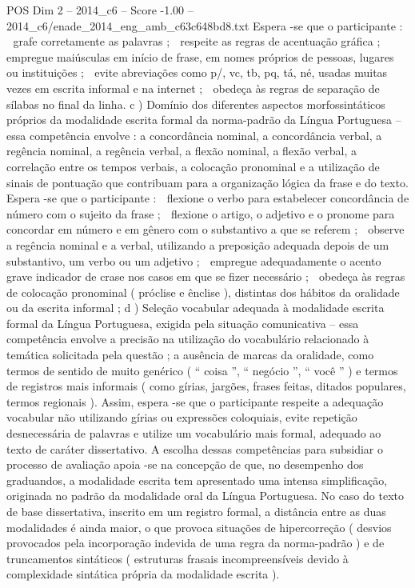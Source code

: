 \begin{textsample}{POS Dim 2 – 2014\_c6 – Score -1.00 – 2014\_c6/enade\_2014\_eng\_amb\_c63c648bd8.txt}
Espera -se que o participante :  grafe corretamente as palavras ;  respeite as regras de acentuação gráfica ;  empregue maiúsculas em início de frase, em nomes próprios de pessoas, lugares ou instituições ;  evite abreviações como p/, vc, tb, pq, tá, né, usadas muitas vezes em escrita informal e na internet ;  obedeça às regras de separação de sílabas no final da linha. c ) Domínio dos diferentes aspectos morfossintáticos próprios da modalidade escrita formal da norma-padrão da Língua Portuguesa – essa competência envolve : a concordância nominal, a concordância verbal, a regência nominal, a regência verbal, a flexão nominal, a flexão verbal, a correlação entre os tempos verbais, a colocação pronominal e a utilização de sinais de pontuação que contribuam para a organização lógica da frase e do texto.
Espera -se que o participante :  flexione o verbo para estabelecer concordância de número com o sujeito da frase ;  flexione o artigo, o adjetivo e o pronome para concordar em número e em gênero com o substantivo a que se referem ;  observe a regência nominal e a verbal, utilizando a preposição adequada depois de um substantivo, um verbo ou um adjetivo ;  empregue adequadamente o acento grave indicador de crase nos casos em que se fizer necessário ;  obedeça às regras de colocação pronominal ( próclise e ênclise ), distintas dos hábitos da oralidade ou da escrita informal ; d ) Seleção vocabular adequada à modalidade escrita formal da Língua Portuguesa, exigida pela situação comunicativa – essa competência envolve a precisão na utilização do vocabulário relacionado à temática solicitada pela questão ; a ausência de marcas da oralidade, como termos de sentido de muito genérico ( “ coisa ”, “ negócio ”, “ você ” ) e termos de registros mais informais ( como gírias, jargões, frases feitas, ditados populares, termos regionais ).
Assim, espera -se que o participante respeite a adequação vocabular não utilizando gírias ou expressões coloquiais, evite repetição desnecessária de palavras e utilize um vocabulário mais formal, adequado ao texto de caráter dissertativo.
A escolha dessas competências para subsidiar o processo de avaliação apoia -se na concepção de que, no desempenho dos graduandos, a modalidade escrita tem apresentado uma intensa simplificação, originada no padrão da modalidade oral da Língua Portuguesa.
No caso do texto de base dissertativa, inscrito em um registro formal, a distância entre as duas modalidades é ainda maior, o que provoca situações de hipercorreção ( desvios provocados pela incorporação indevida de uma regra da norma-padrão ) e de truncamentos sintáticos ( estruturas frasais incompreensíveis devido à complexidade sintática própria da modalidade escrita ).

\end{textsample}

